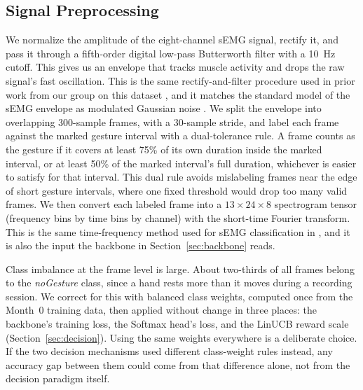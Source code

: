 \documentclass[journal]{IEEEtran}
\begin{document}
\subsection{Signal Preprocessing}
We normalize the amplitude of the eight-channel sEMG signal, rectify it, and pass it through a fifth-order digital low-pass Butterworth filter with a 10~Hz cutoff. This gives us an envelope that tracks muscle activity and drops the raw signal's fast oscillation. This is the same rectify-and-filter procedure used in prior work from our group on this dataset \cite{Isabel2023}, and it matches the standard model of the sEMG envelope as modulated Gaussian noise \cite{Shwedyk1977}. We split the envelope into overlapping 300-sample frames, with a 30-sample stride, and label each frame against the marked gesture interval with a dual-tolerance rule. A frame counts as the gesture if it covers at least 75\% of its own duration inside the marked interval, or at least 50\% of the marked interval's full duration, whichever is easier to satisfy for that interval. This dual rule avoids mislabeling frames near the edge of short gesture intervals, where one fixed threshold would drop too many valid frames. We then convert each labeled frame into a $13\times24\times8$ spectrogram tensor (frequency bins by time bins by channel) with the short-time Fourier transform. This is the same time-frequency method used for sEMG classification in \cite{stftTsai}, and it is also the input the backbone in Section~\ref{sec:backbone} reads.

Class imbalance at the frame level is large. About two-thirds of all frames belong to the \emph{noGesture} class, since a hand rests more than it moves during a recording session. We correct for this with balanced class weights, computed once from the Month~0 training data, then applied without change in three places: the backbone's training loss, the Softmax head's loss, and the LinUCB reward scale (Section~\ref{sec:decision}). Using the same weights everywhere is a deliberate choice. If the two decision mechanisms used different class-weight rules instead, any accuracy gap between them could come from that difference alone, not from the decision paradigm itself.
\end{document}
